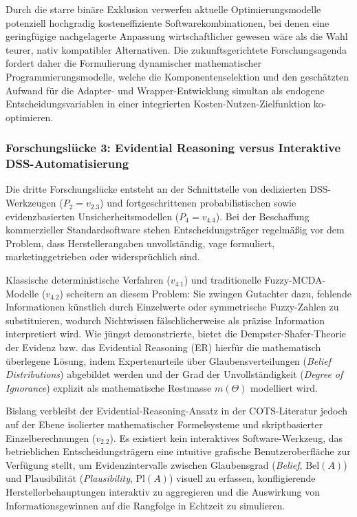 Durch die starre binäre Exklusion verwerfen aktuelle Optimierungsmodelle potenziell hochgradig kosteneffiziente Softwarekombinationen, bei denen eine geringfügige nachgelagerte Anpassung wirtschaftlicher gewesen wäre als die Wahl teurer, nativ kompatibler Alternativen. Die zukunftsgerichtete Forschungsagenda fordert daher die Formulierung dynamischer mathematischer Programmierungsmodelle, welche die Komponentenselektion und den geschätzten Aufwand für die Adapter- und Wrapper-Entwicklung simultan als endogene Entscheidungsvariablen in einer integrierten Kosten-Nutzen-Zielfunktion ko-optimieren.

\subsubsection{Forschungslücke 3: Evidential Reasoning versus Interaktive DSS-Automatisierung}
\label{subsubsec:gap3}

Die dritte Forschungslücke entsteht an der Schnittstelle von dedizierten DSS-Werkzeugen ($P_2 = v_{2.3}$) und fortgeschrittenen probabilistischen sowie evidenzbasierten Unsicherheitsmodellen ($P_4 = v_{4.4}$). Bei der Beschaffung kommerzieller Standardsoftware stehen Entscheidungsträger regelmäßig vor dem Problem, dass Herstellerangaben unvollständig, vage formuliert, marketinggetrieben oder widersprüchlich sind. 

Klassische deterministische Verfahren ($v_{4.1}$) und traditionelle Fuzzy-MCDA-Modelle ($v_{4.2}$) scheitern an diesem Problem: Sie zwingen Gutachter dazu, fehlende Informationen künstlich durch Einzelwerte oder symmetrische Fuzzy-Zahlen zu substituieren, wodurch Nichtwissen fälschlicherweise als präzise Information interpretiert wird. Wie \textcite{LNQHES84} jüngst demonstrierte, bietet die Dempster-Shafer-Theorie der Evidenz bzw. das Evidential Reasoning (ER) hierfür die mathematisch überlegene Lösung, indem Expertenurteile über Glaubensverteilungen (\textit{Belief Distributions}) abgebildet werden und der Grad der Unvollständigkeit (\textit{Degree of Ignorance}) explizit als mathematische Restmasse $m(\Theta)$ modelliert wird.

Bislang verbleibt der Evidential-Reasoning-Ansatz in der COTS-Literatur jedoch auf der Ebene isolierter mathematischer Formelsysteme und skriptbasierter Einzelberechnungen ($v_{2.2}$). Es existiert kein interaktives Software-Werkzeug, das betrieblichen Entscheidungsträgern eine intuitive grafische Benutzeroberfläche zur Verfügung stellt, um Evidenzintervalle zwischen Glaubensgrad (\textit{Belief}, $\text{Bel}(A)$) und Plausibilität (\textit{Plausibility}, $\text{Pl}(A)$) visuell zu erfassen, konfligierende Herstellerbehauptungen interaktiv zu aggregieren und die Auswirkung von Informationsgewinnen auf die Rangfolge in Echtzeit zu simulieren.

